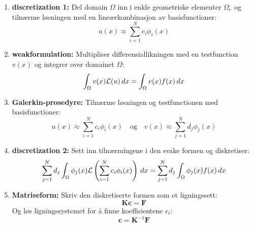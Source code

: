 \begin{enumerate}
	\item \textbf{\gls{discretization} 1:} Del \gls{domain} \( \Omega \) inn i enkle geometriske elementer \( \Omega_e \) og tilnærme løsningen med en lineærkombinasjon av \gls{basisfunction}er:
	      \[
		      u(x) \approx \sum_{i=1}^N c_i \phi_i(x)
	      \]
	\item \textbf{\gls{weakformulation}:} Multipliser differensiallikningen med en \gls{testfunction} \( v(x) \) og integrer over \gls{domain}et \( \Omega \):
	      \[
		      \int_\Omega v(x) \mathcal{L}(u) \, dx = \int_\Omega v(x) f(x) \, dx
	      \]

	\item \textbf{Galerkin-prosedyre:} Tilnærme løsningen og \gls{testfunction}en med \gls{basisfunction}er:
	      \[
		      u(x) \approx \sum_{i=1}^N c_i \phi_i(x) \quad \text{og} \quad v(x) \approx \sum_{j=1}^N d_j \phi_j(x)
	      \]
	\item \textbf{\gls{discretization} 2:} Sett inn tilnærmingene i den svake formen og diskretiser:
	      \[
		      \sum_{j=1}^N d_j \int_\Omega \phi_j(x) \mathcal{L} \left( \sum_{i=1}^N c_i \phi_i(x) \right) \, dx = \sum_{j=1}^N d_j \int_\Omega \phi_j(x) f(x) \, dx
	      \]
	\item \textbf{Matriseform:} Skriv den diskretiserte formen som et ligningssett:
	      \[
		      \symbf{K} \symbf{c} = \symbf{F}
	      \]
	      Og løs ligningssystemet for å finne koeffisientene \(c_i\):
	      \[
		      \symbf{c} = \symbf{K}^{-1} \symbf{F}
	      \]
\end{enumerate}

